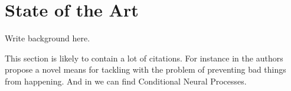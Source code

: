 \chapter{State of the Art} %
\label{chap:background}

Write background here.

This section is likely to contain a lot of citations.
%
For instance in \cite{Ugur-RSS-19} the authors propose a novel means for tackling with the problem of preventing bad things from happening. And in \cite{DBLP:journals/corr/abs-1807-01613} we can find Conditional Neural Processes.
